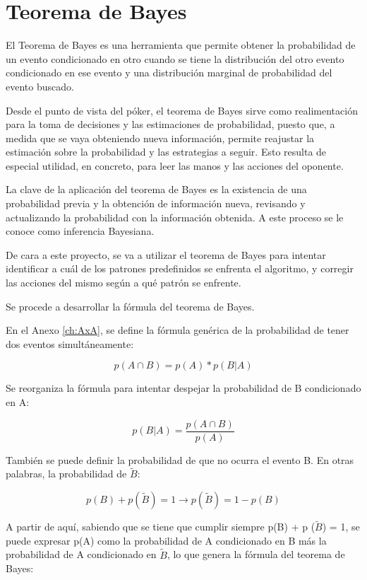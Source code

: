 \section{Teorema de Bayes}
\label{sec:bayes}

El Teorema de Bayes es una herramienta que permite obtener la probabilidad de un evento condicionado en otro cuando se tiene la distribución del otro evento condicionado en ese evento y una distribución marginal de probabilidad del evento buscado. \cite{chen}

Desde el punto de vista del póker, el teorema de Bayes sirve como realimentación para la toma de decisiones y las estimaciones de probabilidad, puesto que, a medida que se vaya obteniendo nueva información, permite reajustar la estimación sobre la probabilidad y las estrategias a seguir. Esto resulta de especial utilidad, en concreto, para leer las manos y las acciones del oponente. 

La clave de la aplicación del teorema de Bayes es la existencia de una probabilidad previa y la obtención de información nueva, revisando y actualizando la probabilidad con la información obtenida. A este proceso se le conoce como inferencia Bayesiana.

De cara a este proyecto, se va a utilizar el teorema de Bayes para intentar identificar a cuál de los patrones predefinidos se enfrenta el algoritmo, y corregir las acciones del mismo según a qué patrón se enfrente.

Se procede a desarrollar la fórmula del teorema de Bayes.\cite{chen}

En el Anexo \ref{ch:AxA}, se define la fórmula genérica de la probabilidad de tener dos eventos simultáneamente:


\[p(A\cap B)=p(A)*p(B | A)\]

Se reorganiza la fórmula para intentar despejar la probabilidad de B condicionado en A:

\[p(B|A)=\frac{p(A\cap B)}{p(A)}\]

También se puede definir la probabilidad de que no ocurra el evento B. En otras palabras, la probabilidad de $\tilde{B}$:

\[p(B) + p (\tilde{B}) = 1 \rightarrow p (\tilde{B}) = 1 - p(B)\]

A partir de aquí, sabiendo que se tiene que cumplir siempre p(B) + p ($\tilde{B}$) = 1, se puede expresar p(A) como la probabilidad de A condicionado en B más la probabilidad de A condicionado en $\tilde{B}$, lo que genera la fórmula del teorema de Bayes:


